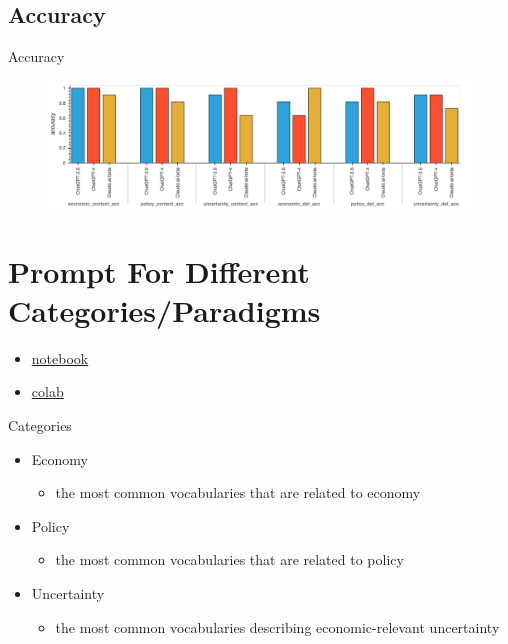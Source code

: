 \documentclass[12pt]{beamer}
\begin{document}
\subsection{Accuracy}
\begin{frame}{Accuracy}
\begin{figure}[H]
\centering
\includegraphics[width=11.5cm]{Figures/fig10.png}
\end{figure}
\end{frame}


\section{Prompt For Different Categories/Paradigms}
\begin{frame}
    \begin{itemize}
        \item \href{https://github.com/githubjacky/EPU-LLM/blob/main/report/meetings/2024-02-19/main.ipynb}{notebook}
        \item \href{https://colab.research.google.com/drive/1lWLRYKCYfCQNzosM4N86OOODuK05UtWe?usp=sharing}{colab}
    \end{itemize}
\end{frame}


\begin{frame}{Categories}
\begin{itemize}
    \item Economy
    \begin{itemize}
        \item the most common vocabularies that are related to economy
    \end{itemize}
    \item Policy
    \begin{itemize}
        \item the most common vocabularies that are related to policy
    \end{itemize}
    \item Uncertainty
    \begin{itemize}
        \item the most common vocabularies describing economic-relevant
            uncertainty
    \end{itemize}
\end{itemize}
\end{frame}
\end{document}
